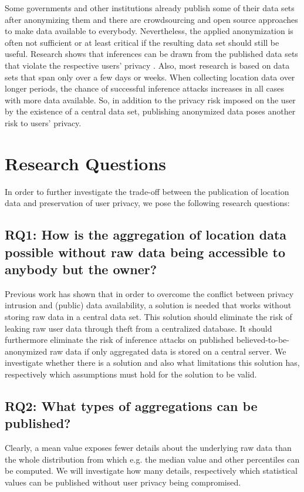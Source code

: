 Some governments and other institutions already publish some of their data sets after anonymizing them 
and there are crowdsourcing and open source approaches to make data available to everybody. 
Nevertheless, the applied anonymization is often not sufficient or at least critical if the resulting data set should still be useful. Research shows that inferences can be drawn from the published data sets that violate the respective users' privacy \parencite{cellphone, twitter}. Also, most research is based on data sets that span only over a few days or weeks. When collecting location data over longer periods, the chance of successful inference attacks increases in all cases with more data available. So, in addition to the privacy risk imposed on the user by the existence of a central data set, publishing anonymized data poses another risk to users' privacy.

\section{Research Questions}
In order to further investigate the trade-off between the publication of location data and preservation of user privacy, we pose the following research questions:

\subsection*{RQ1: How is the aggregation of location data possible without raw data being accessible to anybody but the owner?}
Previous work has shown that in order to overcome the conflict between privacy intrusion and (public) data availability, a solution is needed that works without storing raw data in a central data set.
This solution should eliminate the risk of leaking raw user data through theft from a centralized database. It should furthermore eliminate the risk of inference attacks on published believed-to-be-anonymized raw data if only aggregated data is stored on a central server. We investigate whether there is a solution and also what limitations this solution has, respectively which assumptions must hold for the solution to be valid.

\subsection*{RQ2: What types of aggregations can be published?}
Clearly, a mean value exposes fewer details about the underlying raw data than the whole distribution from which e.g. the median value and other percentiles can be computed. We will investigate how many details, respectively which statistical values can be published without user privacy being compromised.

